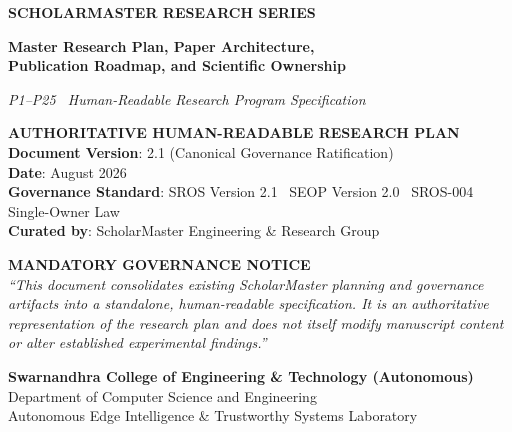 \documentclass[11pt,letterpaper]{article}
\begin{document}
\begin{titlepage}
    \centering
    \vspace*{1.5cm}
    
    {\Huge \bfseries \color{blue!80!black} SCHOLARMASTER RESEARCH SERIES\par}
    \vspace{0.8cm}
    {\LARGE \bfseries Master Research Plan, Paper Architecture,\\ Publication Roadmap, and Scientific Ownership\par}
    \vspace{0.6cm}
    {\Large \textit{P1--P25 \textbar\ Human-Readable Research Program Specification}\par}
    
    \vspace{1.5cm}
    \begin{tcolorbox}[colback=gray!10!white,colframe=gray!70!black,width=0.92\textwidth,center]
        \centering
        \textbf{AUTHORITATIVE HUMAN-READABLE RESEARCH PLAN}\\
        \vspace{0.2cm}
        \small
        \textbf{Document Version}: 2.1 (Canonical Governance Ratification)\\
        \textbf{Date}: August 2026\\
        \textbf{Governance Standard}: SROS Version 2.1 \textbar\ SEOP Version 2.0 \textbar\ SROS-004 Single-Owner Law\\
        \textbf{Curated by}: ScholarMaster Engineering \& Research Group
    \end{tcolorbox}

    \vspace{1.2cm}
    \begin{tcolorbox}[colback=yellow!10!white,colframe=orange!80!black,width=0.92\textwidth,center]
        \small \textbf{MANDATORY GOVERNANCE NOTICE}\\
        \vspace{0.1cm}
        \textit{``This document consolidates existing ScholarMaster planning and governance artifacts into a standalone, human-readable specification. It is an authoritative representation of the research plan and does not itself modify manuscript content or alter established experimental findings.''}
    \end{tcolorbox}

    \vfill
    {\large \textbf{Swarnandhra College of Engineering \& Technology (Autonomous)}\\
    Department of Computer Science and Engineering\\
    Autonomous Edge Intelligence \& Trustworthy Systems Laboratory\par}
    \vspace{1.0cm}
\end{titlepage}
\end{document}
